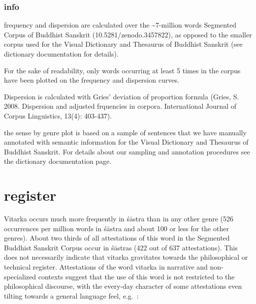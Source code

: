 \documentclass[
  letterpaper,
  DIV=11,
  numbers=noendperiod,
  oneside]{scrreprt}
\begin{document}
\hypertarget{sec-disperioninfo}{%
\subsubsection{info}\label{sec-disperioninfo}}

frequency and dispersion are calculated over the
\textasciitilde7-million words Segmented Corpus of Buddhist Sanskrit
(10.5281/zenodo.3457822), as opposed to the smaller corpus used for the
Visual Dictionary and Thesaurus of Buddhist Sanskrit (see dictionary
documentation for details).

For the sake of readability, only words occurring at least 5 times in
the corpus have been plotted on the frequency and dispersion curves.

Dispersion is calculated with Gries' deviation of proportion formula
(Gries, S. 2008. Dispersion and adjusted frquencies in corpora.
International Journal of Corpus Linguistics, 13(4): 403-437).

the sense by genre plot is based on a sample of sentences that we have
manually annotated with semantic information for the Visual Dictionary
and Thesaurus of Buddhist Sanskrit. For details about our sampling and
annotation procedures see the dictionary documentation page.

\hypertarget{sec-register}{%
\section{register}\label{sec-register}}

Vitarka occurs much more frequently in śāstra than in any other genre
(526 occurrences per million words in śāstra and about 100 or less for
the other genres). About two thirds of all attestations of this word in
the Segmented Buddhist Sanskrit Corpus occur in śāstras (422 out of 637
attestations). This does not necessarily indicate that vitarka
gravitates towards the philosophical or technical register. Attestations
of the word vitarka in narrative and non-specialized contexts suggest
that the use of this word is not restricted to the philosophical
discourse, with the every-day character of some attestations even
tilting towards a general language feel, e.g.~:
\end{document}
